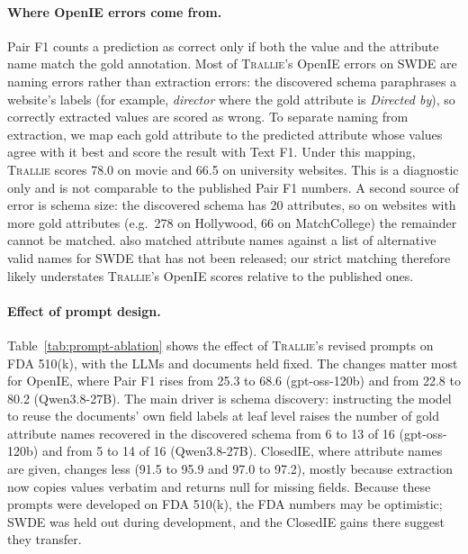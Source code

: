 \paragraph{Where OpenIE errors come from.}
Pair F1 counts a prediction as correct only if both the value and the attribute name
match the gold annotation. Most of \textsc{Trallie}'s OpenIE errors on SWDE are naming
errors rather than extraction errors: the discovered schema paraphrases a website's
labels (for example, \emph{director} where the gold attribute is \emph{Directed by}),
so correctly extracted values are scored as wrong.
To separate naming from extraction, we map each gold attribute to the predicted
attribute whose values agree with it best and score the result with Text F1.
Under this mapping, \textsc{Trallie} scores 78.0 on movie and 66.5 on university
websites. This is a diagnostic only and is not comparable to the published Pair F1 numbers.
A second source of error is schema size: the discovered schema has 20 attributes,
so on websites with more gold attributes (e.g.\ 278 on Hollywood, 66 on MatchCollege)
the remainder cannot be matched.
\citet{arora2023evaporate} also matched attribute names against a list of alternative
valid names for SWDE that has not been released; our strict matching therefore likely
understates \textsc{Trallie}'s OpenIE scores relative to the published ones.

\paragraph{Effect of prompt design.}
Table~\ref{tab:prompt-ablation} shows the effect of \textsc{Trallie}'s revised prompts
on FDA 510(k), with the LLMs and documents held fixed.
The changes matter most for OpenIE, where Pair F1 rises from 25.3 to 68.6
(gpt-oss-120b) and from 22.8 to 80.2 (Qwen3.8-27B).
The main driver is schema discovery: instructing the model to reuse the documents' own
field labels at leaf level raises the number of gold attribute names recovered in the
discovered schema from 6 to 13 of 16 (gpt-oss-120b) and from 5 to 14 of 16
(Qwen3.8-27B).
ClosedIE, where attribute names are given, changes less (91.5 to 95.9 and 97.0 to
97.2), mostly because extraction now copies values verbatim and returns null for
missing fields.
Because these prompts were developed on FDA 510(k), the FDA numbers may be optimistic;
SWDE was held out during development, and the ClosedIE gains there suggest they
transfer.
